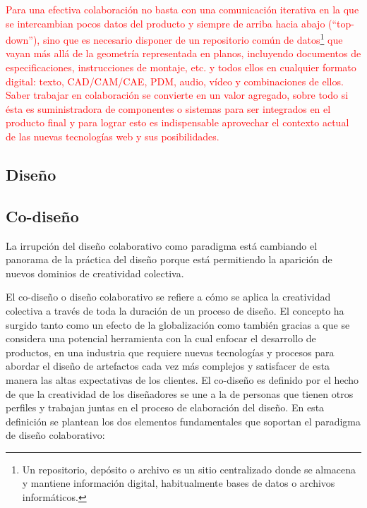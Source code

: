 \textcolor{red}{
Para una efectiva colaboración no basta con una comunicación iterativa en la que se intercambian pocos datos del producto y siempre de arriba hacia abajo (“top-down”), sino que es necesario disponer de un repositorio común de datos\footnote{Un repositorio, depósito o archivo es un sitio centralizado donde se almacena y mantiene información digital, habitualmente bases de datos o archivos informáticos.} que vayan más allá de la geometría representada en planos, incluyendo documentos de especificaciones, instrucciones de
montaje, etc. y todos ellos en cualquier formato digital: texto, CAD/CAM/CAE, PDM, audio, vídeo y combinaciones de ellos.
Saber trabajar en colaboración se convierte en un valor agregado, sobre todo si ésta es suministradora de componentes o sistemas para ser integrados en el producto final y para lograr esto es indispensable aprovechar el contexto actual de las nuevas tecnologías web y sus posibilidades. \cite{Ruiz} }

\subsection{Diseño}
\cite{Pereiro2005}



\subsection{Co-diseño}

La irrupción del diseño colaborativo como paradigma está cambiando el panorama de la práctica del diseño porque está permitiendo la aparición de nuevos dominios de creatividad colectiva. 

El co-diseño o diseño colaborativo se refiere a cómo se aplica la creatividad colectiva a través de toda la duración de un proceso de diseño. El concepto ha surgido tanto como un efecto de la globalización como también gracias a que se considera una potencial herramienta con la cual enfocar el desarrollo de productos, en una industria que requiere
nuevas tecnologías y procesos para abordar el diseño de artefactos cada vez más complejos y satisfacer de esta manera las altas expectativas de los clientes. 
El co-diseño es definido por el hecho de que la creatividad de los diseñadores se une a la de personas que tienen otros perfiles y trabajan juntas en el proceso de elaboración del diseño.
En esta definición se plantean los dos elementos fundamentales que soportan el paradigma de diseño colaborativo:

